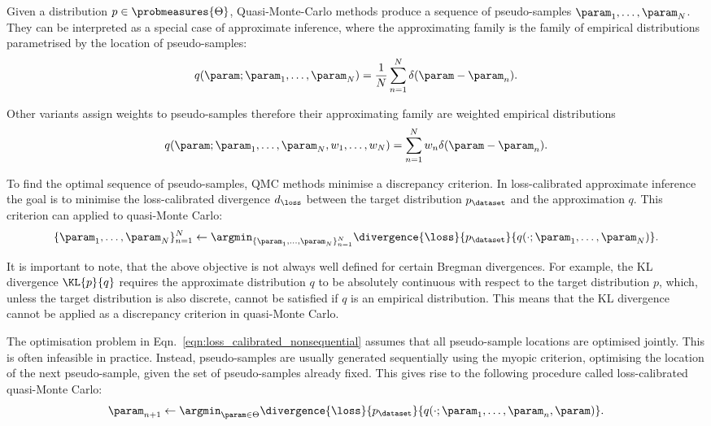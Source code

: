 Given a distribution $p\in\probmeasures{\Theta}$, Quasi-Monte-Carlo methods produce a sequence of pseudo-samples $\param_1,\ldots,\param_N$. They can be interpreted as a special case of approximate inference, where the approximating family is the family of empirical distributions parametrised by the location of pseudo-samples:
%
\begin{equation}
	q(\param ; \param_1,\ldots,\param_N) = \frac{1}{N} \sum_{n=1}^{N} \delta(\param - \param_n).
\end{equation}

Other variants assign weights to pseudo-samples therefore their approximating family are weighted empirical distributions
%
\begin{equation}
	q(\param ; \param_1,\ldots,\param_N,w_1,\ldots,w_N) = \sum_{n=1}^{N} w_n \delta(\param - \param_n).
\end{equation}

To find the optimal sequence of pseudo-samples, QMC methods minimise a discrepancy criterion. In loss-calibrated approximate inference the goal is to minimise the loss-calibrated divergence $d_\loss$ between the target distribution $p_\dataset$ and the approximation $q$. This criterion can applied to quasi-Monte Carlo:
%
\begin{equation}
	\{\param_1,\ldots,\param_N\}_{n=1}^{N} \leftarrow \argmin_{\{\param_1,\ldots,\param_N\}_{n=1}^{N}} \divergence{\loss}{p_\dataset}{q(\cdot ; \param_1,\ldots,\param_N)}. \label{eqn:loss_calibrated_nonsequential}
\end{equation}

It is important to note, that the above objective is not always well defined for certain Bregman divergences. For example, the KL divergence $\KL{p}{q}$ requires the approximate distribution $q$ to be absolutely continuous with respect to the target distribution $p$, which, unless the target distribution is also discrete, cannot be satisfied if $q$ is an empirical distribution. This means that the KL divergence cannot be applied as a discrepancy criterion in quasi-Monte Carlo.

The optimisation problem in Eqn.\ \ref{eqn:loss_calibrated_nonsequential} assumes that all pseudo-sample locations are optimised jointly. This is often infeasible in practice. Instead, pseudo-samples are usually generated sequentially using the myopic criterion, optimising the location of the next pseudo-sample, given the set of pseudo-samples already fixed. This gives rise to the following procedure called loss-calibrated quasi-Monte Carlo:
%
\begin{equation}
	\param_{n+1} \leftarrow \argmin_{\param \in \Theta} \divergence{\loss}{p_\dataset}{q(\cdot ; \param_1,\ldots,\param_{n},\param)}. \label{eqn:loss_calibrated_sequential}
\end{equation}

